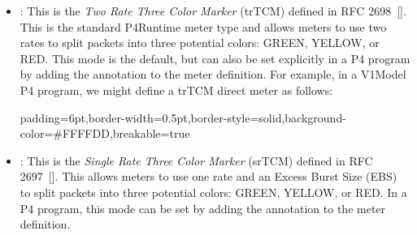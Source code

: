 \documentclass[11pt]{article}
\begin{document}
{\begin{itemize}
\begin{itemize}[noitemsep,topsep=\mdcompacttopsep]%

\item{}: This is the \emph{Two Rate Three Color Marker} (trTCM)
defined in RFC 2698~[]. This is the standard P4Runtime meter type
and allows meters to use two rates to split packets into three potential
colors: GREEN, YELLOW, or RED. This mode is the default, but can also be
set explicitly in a P4 program by adding the 
annotation to the meter definition.
For example, in a V1Model P4 program, we might define a trTCM direct meter
as follows:

\begin{mdbmargintb}{6pt}{6pt}%
\begin{mdblock}{padding=6pt,border-width=0.5pt,border-style=solid,background-color=\#FFFFDD,breakable=true}%
\begin{mdpre}%
\end{mdpre}%
\end{mdblock}%
\end{mdbmargintb}%

\item{}: This is the \emph{Single Rate Three Color Marker}
(srTCM) defined in RFC 2697~[]. This allows meters to use one rate
and an Excess Burst Size (EBS) to split packets into three potential
colors: GREEN, YELLOW, or RED. In a P4 program, this mode can be set by
adding the  annotation to the meter definition.%


\end{itemize}
\end{itemize}}
\end{document}
